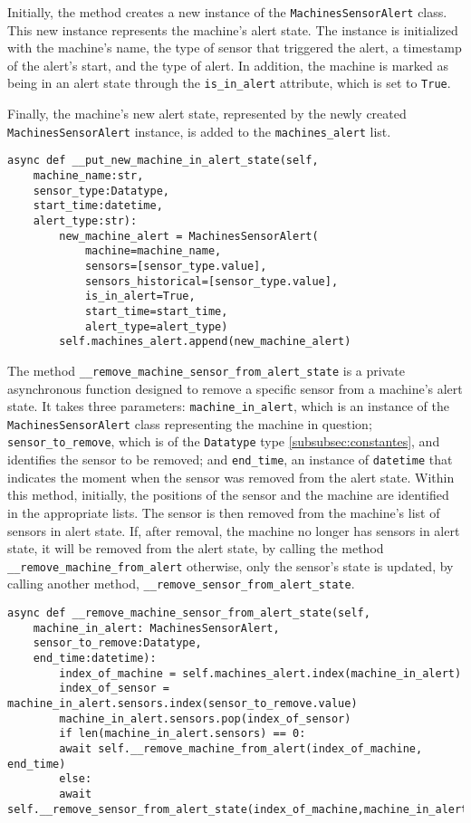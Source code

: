 Initially, the method creates a new instance of the \texttt{MachinesSensorAlert} class. This new instance represents the machine's alert state. The instance is initialized with the machine's name, the type of sensor that triggered the alert, a timestamp of the alert's start, and the type of alert. In addition, the machine is marked as being in an alert state through the \texttt{is\_in\_alert} attribute, which is set to \texttt{True}.

Finally, the machine's new alert state, represented by the newly created \texttt{MachinesSensorAlert} instance, is added to the \texttt{machines\_alert} list.

\begin{Verbatim}[fontsize=\small, baselinestretch=0.8]
async def __put_new_machine_in_alert_state(self,
    machine_name:str,
    sensor_type:Datatype,
    start_time:datetime,
    alert_type:str):
        new_machine_alert = MachinesSensorAlert(
            machine=machine_name,
            sensors=[sensor_type.value],
            sensors_historical=[sensor_type.value],
            is_in_alert=True,
            start_time=start_time,
            alert_type=alert_type)
        self.machines_alert.append(new_machine_alert)
\end{Verbatim}

The method \texttt{\_\_remove\_machine\_sensor\_from\_alert\_state} is a private asynchronous function designed to remove a specific sensor from a machine's alert state. It takes three parameters: \texttt{machine\_in\_alert}, which is an instance of the \texttt{MachinesSensorAlert} class representing the machine in question; \texttt{sensor\_to\_remove}, which is of the \texttt{Datatype} type \ref{subsubsec:constantes}, and identifies the sensor to be removed; and \texttt{end\_time}, an instance of \texttt{datetime} that indicates the moment when the sensor was removed from the alert state. Within this method, initially, the positions of the sensor and the machine are identified in the appropriate lists. The sensor is then removed from the machine's list of sensors in alert state. If, after removal, the machine no longer has sensors in alert state, it will be removed from the alert state, by calling the method \texttt{\_\_remove\_machine\_from\_alert} otherwise, only the sensor's state is updated, by calling another method, \texttt{\_\_remove\_sensor\_from\_alert\_state}.

\begin{Verbatim}[fontsize=\small, baselinestretch=0.8]
async def __remove_machine_sensor_from_alert_state(self,
    machine_in_alert: MachinesSensorAlert,
    sensor_to_remove:Datatype,
    end_time:datetime):
        index_of_machine = self.machines_alert.index(machine_in_alert)
        index_of_sensor = machine_in_alert.sensors.index(sensor_to_remove.value)
        machine_in_alert.sensors.pop(index_of_sensor)
        if len(machine_in_alert.sensors) == 0:
        await self.__remove_machine_from_alert(index_of_machine, end_time)
        else:
        await self.__remove_sensor_from_alert_state(index_of_machine,machine_in_alert)
\end{Verbatim}

